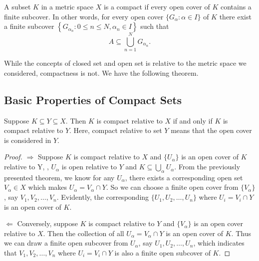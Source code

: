 \begin{defn}
A subset $K$ in a metric space $X$ is a compact if every open cover of
$K$ contains a finite subcover. 
In other words, for every open cover $\{G_\alpha: \alpha \in I\}$ of $K$ 
there exist a finite subcover $\left\{G_{\alpha_n}: 0 \le n \le N, 
\alpha_n \in I \right\}$ such that 
\begin{equation*}
    A \subseteq \bigcup_{n=1}^N G_{\alpha_n}. 
\end{equation*}
\end{defn}

While the concepts of closed set and open set is relative to the 
metric space we considered, compactness is not. We have the following 
theorem.

\subsection{Basic Properties of Compact Sets}
\begin{thm}
Suppose $K\subseteq Y \subseteq X$. Then $K$ is compact relative to $X$ if 
and only if $K$ is compact relative to $Y$. Here, compact relative to 
set $Y$ means that the open cover is considered in $Y$.
\end{thm}
\begin{proof}
$\Rightarrow$ Suppose $K$ is compact relative to $X$ and $\{U_\alpha\}$ is 
an open cover of $K$ relative to Y, \ie, $U_\alpha$ is open relative to 
$Y$ and $K \subseteq \bigcup_\alpha U_\alpha$. From the previously presented 
theorem, we know for any $U_\alpha$, there exists a corresponding open 
set $V_\alpha \in X$ which makes $U_\alpha = V_\alpha \cap Y$. So we 
can choose a finite open cover from $\{V_\alpha\}$, say $V_1, V_2, \ldots, 
V_n$. Evidently, the corresponding $\{U_1, U_2, \ldots, U_n\}$ where 
$U_i = V_i \cap Y$ is an open cover of $K$.

$\Leftarrow$ Conversely, suppose $K$ is compact relative to $Y$ and 
$\{V_\alpha\}$ is an open cover relative to $X$. Then the collection of 
all $U_\alpha = V_\alpha \cap Y$ is an open cover of $K$. Thus we 
can draw a finite open subcover from $U_\alpha$, say $U_1, U_2, \ldots, 
U_n$, which indicates that $V_1, V_2, \ldots, V_n$ where $U_i = V_i \cap 
Y$ is also a finite open subcover of $K$.
\end{proof}

